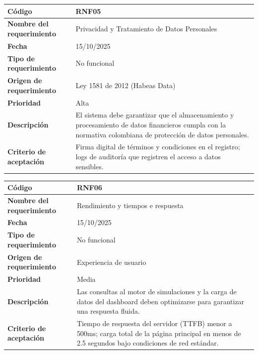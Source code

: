 \begin{table}[H]
	\begin{tabular}{|s{5cm}|m{11cm}|}
		\hline
		\textbf{Código} & RNF05 \\ \hline
		\textbf{Nombre del requerimiento} & Privacidad y Tratamiento de Datos Personales \\ \hline
		\textbf{Fecha} & 15/10/2025 \\ \hline
		\textbf{Tipo de requerimiento} & No funcional \\ \hline
		\textbf{Origen de requerimiento} &Ley 1581 de 2012 (Habeas Data) \\ \hline
		\textbf{Prioridad} & Alta \\ \hline
		\textbf{Descripción} & El sistema debe garantizar que el almacenamiento y procesamiento de datos financieros cumpla con la normativa colombiana de protección de datos personales. \\ \hline
		\textbf{Criterio de aceptación} & Firma digital de términos y condiciones en el registro; logs de auditoría que registren el acceso a datos sensibles. \\ \hline
	\end{tabular}
\end{table}

\begin{table}[H]
	\begin{tabular}{|s{5cm}|m{11cm}|}
		\hline
		\textbf{Código} & RNF06 \\ \hline
		\textbf{Nombre del requerimiento} & Rendimiento y tiempos e respuesta \\ \hline
		\textbf{Fecha} & 15/10/2025 \\ \hline
		\textbf{Tipo de requerimiento} & No funcional \\ \hline
		\textbf{Origen de requerimiento} & Experiencia de usuario \\ \hline
		\textbf{Prioridad} & Media \\ \hline
		\textbf{Descripción} & Las consultas al motor de simulaciones y la carga de datos del dashboard deben optimizarse para garantizar una respuesta fluida. \\ \hline
		\textbf{Criterio de aceptación} & Tiempo de respuesta del servidor (TTFB) menor a 500ms; carga total de la página principal en menos de 2.5 segundos bajo condiciones de red estándar. \\ \hline
	\end{tabular}
\end{table}

